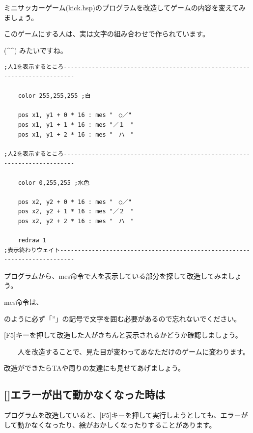 \exampleinduction

ミニサッカーゲーム(kick.hsp)のプログラムを改造してゲームの内容を変えてみましょう。

このゲームにする人は、実は文字の組み合わせで作られています。

(\^{}\^{}) みたいですね。


\begin{lstlisting}[firstnumber=64,caption=ミニサッカーゲームのプログラムの一部]
;人1を表示するところ-------------------------------------------------------------------------

    color 255,255,255 ;白

    pos x1, y1 + 0 * 16 : mes "　○／"
    pos x1, y1 + 1 * 16 : mes "／１　"
    pos x1, y1 + 2 * 16 : mes "　ハ　"

;人2を表示するところ-------------------------------------------------------------------------

    color 0,255,255 ;水色

    pos x2, y2 + 0 * 16 : mes "　○／"
    pos x2, y2 + 1 * 16 : mes "／２　"
    pos x2, y2 + 2 * 16 : mes "　ハ　"

    redraw 1
;表示終わりウェイト--------------------------------------------------------------------------
\end{lstlisting}



プログラムから、mes命令で人を表示している部分を探して改造してみましょう。

mes命令は、



のように必ず「”」の記号で文字を囲む必要があるので忘れないでください。

\exampleanswer


[F5]キーを押して改造した人がきちんと表示されるかどうか確認しましょう。

\ \ \ \ 人を改造することで、見た目が変わってあなただけのゲームに変わります。

改造ができたらTAや周りの友達にも見せてあげましょう。

\clearpage

\subsection*{[]エラーが出て動かなくなった時は}

プログラムを改造していると、[F5]キーを押して実行しようとしても、エラーがして動かなくなったり、絵がおかしくなったりすることがあります。


